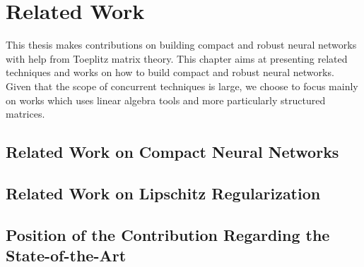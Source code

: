 \chapter{Related Work}
\label{chapter:ch3-related_work}
\localtableofcontents
\vspace{\marginbellowtable}

This thesis makes contributions on building compact and robust neural networks with help from Toeplitz matrix theory.
This chapter aims at presenting related techniques and works on how to build compact and robust neural networks. 
Given that the scope of concurrent techniques is large, we choose to focus mainly on works which uses linear algebra tools and more particularly structured matrices.

\section{Related Work on Compact Neural Networks}
\label{section:ch3-related_work_on_compact_neural_networks}


\section{Related Work on Lipschitz Regularization}
\label{section:ch3-related_work_on_lipschitz_regularization}


\section{Position of the Contribution Regarding the State-of-the-Art}
\label{section:ch3-position_of_the_contribution_regarding_the_state-of-the-art}


